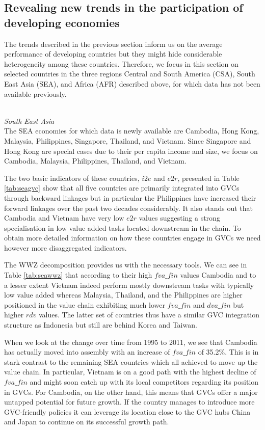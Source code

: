 \documentclass[11pt,a4paper]{article}
\begin{document}
\subsection{Revealing new trends in the participation of developing economies}

The trends described in the previous section inform us on the average performance of developing countries but they might hide considerable heterogeneity among these countries. Therefore, we focus in this section on selected countries in the three regions Central and South America (CSA), South East Asia (SEA), and Africa (AFR) described above, for which data has not been available previously.\\\

\textit{South East Asia}\\
The SEA economies for which data is newly available are Cambodia, Hong Kong, Malaysia, Philippines, Singapore, Thailand, and Vietnam. Since Singapore and Hong Kong are special cases due to their per capita income and size, we focus on Cambodia, Malaysia, Philippines, Thailand, and Vietnam. 

The two basic indicators of these countries, $i2e$ and $e2r$, presented in Table \ref{tab:seagvc} show that all five countries are primarily integrated into GVCs through backward linkages but in particular the Philippines have increased their forward linkages over the past two decades considerably. It also stands out that Cambodia and Vietnam have very low $e2r$ values suggesting a strong specialisation in low value added tasks located downstream in the chain. To obtain more detailed information on how these countries engage in GVCs we need however more disaggregated indicators.

The WWZ decomposition provides us with the necessary tools. We can see in Table \ref{tab:seawwz} that according to their high $fva\_fin$ values Cambodia and to a lesser extent Vietnam indeed perform mostly downstream tasks with typically low value added whereas Malaysia, Thailand, and the Philippines are higher positioned in the value chain exhibiting much lower $fva\_fin$ and $dva\_fin$ but higher $rdv$ values. The latter set of countries thus have a similar GVC integration structure as Indonesia but still are behind Korea and Taiwan. 

When we look at the change over time from 1995 to 2011, we see that Cambodia has actually moved into assembly with an increase of $fva\_fin$ of 35.2\%. This is in stark contrast to the remaining SEA countries which all achieved to move up the value chain. In particular, Vietnam is on a good path with the highest decline of $fva\_fin$ and might soon catch up with its local competitors regarding its position in GVCs. For Cambodia, on the other hand, this means that GVCs offer a major untapped potential for future growth. If the country manages to introduce more GVC-friendly policies it can leverage its location close to the GVC hubs China and Japan to continue on its successful growth path.\\
\end{document}
